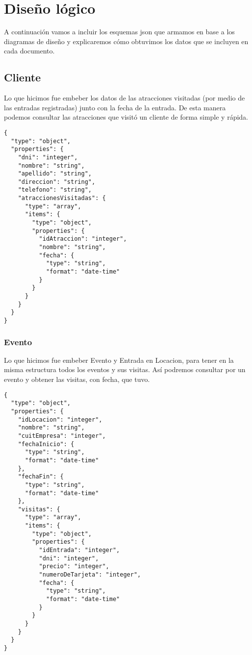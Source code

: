 \section{Diseño lógico}

\par A continuación vamos a incluir los esquemas json que armamos en base a los diagramas de diseño y explicaremos cómo obtuvimos los datos que se incluyen en cada documento.

\subsection{Cliente}
\par Lo que hicimos fue embeber los datos de las atracciones visitadas (por medio de las entradas registradas) junto con la fecha de la entrada.
De esta manera podemos consultar las atracciones que visitó un cliente de forma simple y rápida.
\begin{verbatim}
{
  "type": "object",
  "properties": {
    "dni": "integer",
    "nombre": "string",
    "apellido": "string",
    "direccion": "string",
    "telefono": "string",
    "atraccionesVisitadas": {
      "type": "array",
      "items": {
        "type": "object",
        "properties": {
          "idAtraccion": "integer",
          "nombre": "string",
          "fecha": {
            "type": "string",
            "format": "date-time"
          }
        }
      }
    }
  }
}
\end{verbatim}

\subsubsection{Evento}
\par Lo que hicimos fue embeber Evento y Entrada en Locacion, para tener en la misma estructura todos los eventos y sus visitas.
Así podremos consultar por un evento y obtener las visitas, con fecha, que tuvo.
\begin{verbatim}
{
  "type": "object",
  "properties": {
    "idLocacion": "integer",
    "nombre": "string",
    "cuitEmpresa": "integer",
    "fechaInicio": {
      "type": "string",
      "format": "date-time"
    },
    "fechaFin": {
      "type": "string",
      "format": "date-time"
    },
    "visitas": {
      "type": "array",
      "items": {
        "type": "object",
        "properties": {
          "idEntrada": "integer",
          "dni": "integer",
          "precio": "integer",
          "numeroDeTarjeta": "integer",
          "fecha": {
            "type": "string",
            "format": "date-time"
          }
        }
      }
    }
  }
}
\end{verbatim}

